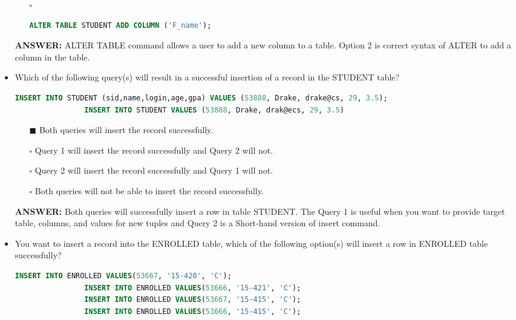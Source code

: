 \documentclass[10pt]{article}
\begin{document}
\begin{itemize}
\begin{enumerate}
				\item[$\square$] 
					\begin{lstlisting}[language=SQL,firstline=1, lastline=1, numbers = right] 
						ALTER TABLE STUDENT ADD COLUMN ('F_name');
					\end{lstlisting}
			\end{enumerate}
			\color{red} \textbf{ANSWER:} \color{black} ALTER TABLE command allows a user to add a new column to a table. Option 2 is correct syntax of ALTER to add a column in the table.
		
		\item Which of the following query(s) will result in a successful insertion of a record in the STUDENT table?
			\begin{lstlisting}[language=SQL,firstline=1, lastline=2] 
				INSERT INTO STUDENT (sid,name,login,age,gpa) VALUES (53888, Drake, drake@cs, 29, 3.5);
				INSERT INTO STUDENT VALUES (53888, Drake, drak@ecs, 29, 3.5)
			\end{lstlisting} 

			\begin{enumerate}
				\item[$\blacksquare$] Both queries will insert the record successfully.
				\item[$\square$] Query 1 will insert the record successfully and Query 2 will not.
				\item[$\square$] Query 2 will insert the record successfully and Query 1 will not.
				\item[$\square$] Both queries will not be able to insert the record successfully.
			\end{enumerate}
			\color{red} \textbf{ANSWER:} \color{black} Both queries will successfully insert a row in table STUDENT. The Query 1 is useful when you want to provide target table, columns, and values for new tuples and Query 2 is a Short-hand version of insert command.

		\item You want to insert a record into the ENROLLED table, which of the following option(s) will insert a row in ENROLLED table successfully?
			\begin{lstlisting}[language=SQL,firstline=1, lastline=4] 
				INSERT INTO ENROLLED VALUES(53667, '15-420', 'C');
				INSERT INTO ENROLLED VALUES(53666, '15-421', 'C');
				INSERT INTO ENROLLED VALUES(53667, '15-415', 'C');
				INSERT INTO ENROLLED VALUES(53666, '15-415', 'C');
			\end{lstlisting}


\end{itemize}
\end{document}
